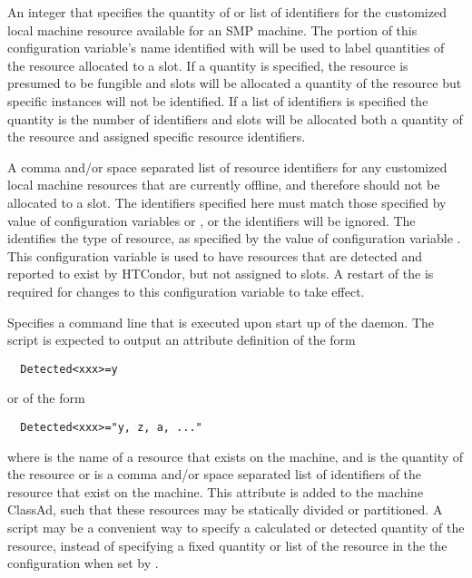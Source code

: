 \begin{description}
\label{param:MachineResourceName}
\item[\Macro{MACHINE\_RESOURCE\_<name>}]
  An integer that specifies the quantity of or list of identifiers for
  the customized local machine resource available for an SMP machine.
  The portion of this configuration variable's name identified with
   will be used to label quantities of the resource allocated
  to a slot.
  If a quantity is specified, the resource is presumed to be fungible
  and slots will be allocated a quantity of the resource but specific
  instances will not be identified.  If a list of identifiers is specified
  the quantity is the number of identifiers and slots will be allocated
  both a quantity of the resource and assigned specific resource identifiers.

\label{param:OfflineMachineResourceName}
\item[\Macro{OFFLINE\_MACHINE\_RESOURCE\_<name>}]
  A comma and/or space separated list of resource identifiers for any 
  customized local machine resources that are currently offline, 
  and therefore should not be allocated to a slot.
  The identifiers specified here must match those specified by value of
  configuration variables  or 
  ,
  or the identifiers will be ignored.
  The  identifies the type of resource,
  as specified by the value of configuration variable
  .
  This configuration variable is used to have resources that are detected 
  and reported to exist by HTCondor,
  but not assigned to slots. 
  A restart of the  is required for changes to this
  configuration variable to take effect.

\label{param:MachineResourceInventoryName}
\item[\Macro{MACHINE\_RESOURCE\_INVENTORY\_<name>}]
  Specifies a command line that is executed upon start up of the 
   daemon.  The script is expected to output an attribute
  definition of the form
\begin{verbatim}
  Detected<xxx>=y
\end{verbatim}
  or of the form
\begin{verbatim}
  Detected<xxx>="y, z, a, ..."
\end{verbatim}
  where  is the name of a resource that exists on the machine,
  and  is the quantity of the resource or  is
  a comma and/or space separated list of identifiers of the
  resource that exist on the machine.
  This attribute is added to the machine ClassAd,
  such that
  these resources may be statically divided or partitioned.
  A script may be a convenient way to specify a calculated or 
  detected quantity of the resource, instead of specifying a
  fixed quantity or list of the resource
  in the the configuration when set by .


\end{description}
